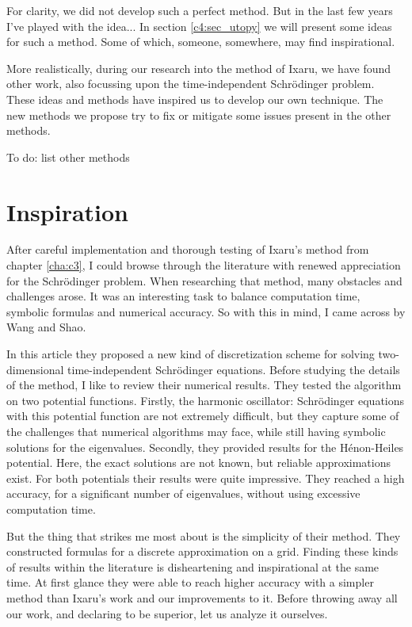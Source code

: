 For clarity, we did not develop such a perfect method. But in the last few years I've played with the idea... In section \ref{c4:sec_utopy} we will present some ideas for such a method. Some of which, someone, somewhere, may find inspirational.

More realistically, during our research into the method of Ixaru, we have found other work, also focussing upon the time-independent Schrödinger problem. These ideas and methods have inspired us to develop our own technique. The new methods we propose try to fix or mitigate some issues present in the other methods.

    {\color{red} To do: list other methods}

\section{Inspiration}

After careful implementation and thorough testing of Ixaru's method from chapter \ref{cha:c3}, I could browse through the literature with renewed appreciation for the Schrödinger problem. When researching that method, many obstacles and challenges arose. It was an interesting task to balance computation time, symbolic formulas and numerical accuracy. So with this in mind, I came across \cite{wang_new_2009} by Wang and Shao.

In this article they proposed a new kind of discretization scheme for solving two-dimensional time-independent Schrödinger equations. Before studying the details of the method, I like to review their numerical results. They tested the algorithm on two potential functions. Firstly, the harmonic oscillator: Schrödinger equations with this potential function are not extremely difficult, but they capture some of the challenges that numerical algorithms may face, while still having symbolic solutions for the eigenvalues. Secondly, they provided results for the Hénon-Heiles potential. Here, the exact solutions are not known, but reliable approximations exist. For both potentials their results were quite impressive. They reached a high accuracy, for a significant number of eigenvalues, without using excessive computation time.

But the thing that strikes me most about \cite{wang_new_2009} is the simplicity of their method. They constructed formulas for a discrete approximation on a grid. Finding these kinds of results within the literature is disheartening and inspirational at the same time. At first glance they were able to reach higher accuracy with a simpler method than Ixaru's work \cite{ixaru_new_2010} and our improvements \cite{baeyens_improvements_2022} to it. Before throwing away all our work, and declaring \cite{wang_new_2009} to be superior, let us analyze it ourselves.

